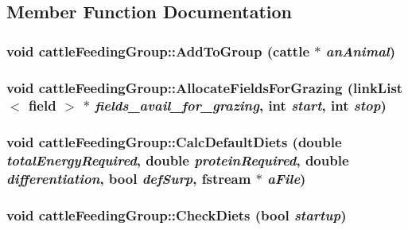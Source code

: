 \subsection{Member Function Documentation}
\hypertarget{classcattle_feeding_group_a3782389717c9de1fe181a04802890e43}{
\subsubsection[{AddToGroup}]{\setlength{\rightskip}{0pt plus 5cm}void cattleFeedingGroup::AddToGroup ({\bf cattle} $\ast$ {\em anAnimal})}}
\label{classcattle_feeding_group_a3782389717c9de1fe181a04802890e43}
\hypertarget{classcattle_feeding_group_a035950bdc3bfd5e231fc7e989fc42015}{
\subsubsection[{AllocateFieldsForGrazing}]{\setlength{\rightskip}{0pt plus 5cm}void cattleFeedingGroup::AllocateFieldsForGrazing ({\bf linkList}$<$ {\bf field} $>$ $\ast$ {\em fields\_\-avail\_\-for\_\-grazing}, \/  int {\em start}, \/  int {\em stop})}}
\label{classcattle_feeding_group_a035950bdc3bfd5e231fc7e989fc42015}
\hypertarget{classcattle_feeding_group_ad040236c2e171aa23bfc0acf0226d7b9}{
\subsubsection[{CalcDefaultDiets}]{\setlength{\rightskip}{0pt plus 5cm}void cattleFeedingGroup::CalcDefaultDiets (double {\em totalEnergyRequired}, \/  double {\em proteinRequired}, \/  double {\em differentiation}, \/  bool {\em defSurp}, \/  fstream $\ast$ {\em aFile})}}
\label{classcattle_feeding_group_ad040236c2e171aa23bfc0acf0226d7b9}
\hypertarget{classcattle_feeding_group_a620bdb68d80e077f170ea3086c15c9b6}{
\subsubsection[{CheckDiets}]{\setlength{\rightskip}{0pt plus 5cm}void cattleFeedingGroup::CheckDiets (bool {\em startup})}}
